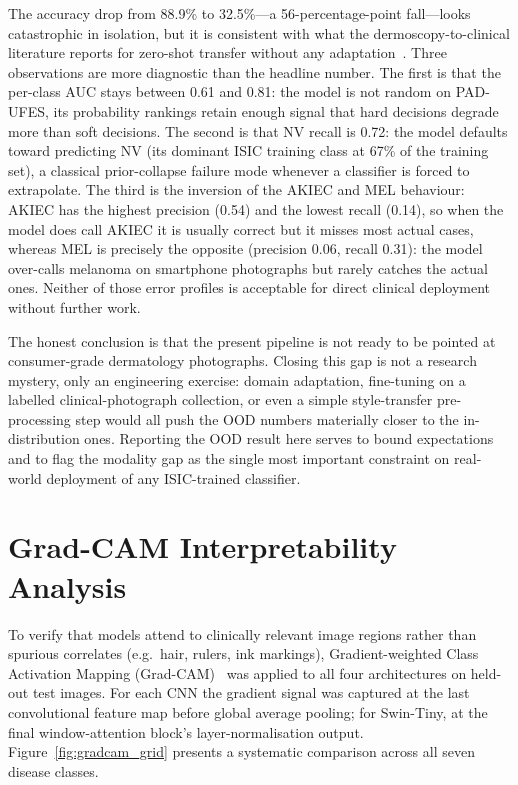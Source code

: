 The accuracy drop from 88.9\% to 32.5\%---a 56-percentage-point fall---looks catastrophic in isolation, but it is consistent with what the dermoscopy-to-clinical literature reports for zero-shot transfer without any adaptation~\cite{pacheco2020metadata}. Three observations are more diagnostic than the headline number. The first is that the per-class AUC stays between 0.61 and 0.81: the model is not random on PAD-UFES, its probability rankings retain enough signal that hard decisions degrade more than soft decisions. The second is that NV recall is 0.72: the model defaults toward predicting NV (its dominant ISIC training class at 67\% of the training set), a classical prior-collapse failure mode whenever a classifier is forced to extrapolate. The third is the inversion of the AKIEC and MEL behaviour: AKIEC has the highest precision (0.54) and the lowest recall (0.14), so when the model does call AKIEC it is usually correct but it misses most actual cases, whereas MEL is precisely the opposite (precision 0.06, recall 0.31): the model over-calls melanoma on smartphone photographs but rarely catches the actual ones. Neither of those error profiles is acceptable for direct clinical deployment without further work.

The honest conclusion is that the present pipeline is not ready to be pointed at consumer-grade dermatology photographs. Closing this gap is not a research mystery, only an engineering exercise: domain adaptation, fine-tuning on a labelled clinical-photograph collection, or even a simple style-transfer pre-processing step would all push the OOD numbers materially closer to the in-distribution ones. Reporting the OOD result here serves to bound expectations and to flag the modality gap as the single most important constraint on real-world deployment of any ISIC-trained classifier.

\section{Grad-CAM Interpretability Analysis}

To verify that models attend to clinically relevant image regions rather than spurious correlates (e.g.\ hair, rulers, ink markings), Gradient-weighted Class Activation Mapping (Grad-CAM)~\cite{selvaraju2017grad} was applied to all four architectures on held-out test images. For each CNN the gradient signal was captured at the last convolutional feature map before global average pooling; for Swin-Tiny, at the final window-attention block's layer-normalisation output. Figure~\ref{fig:gradcam_grid} presents a systematic comparison across all seven disease classes.

